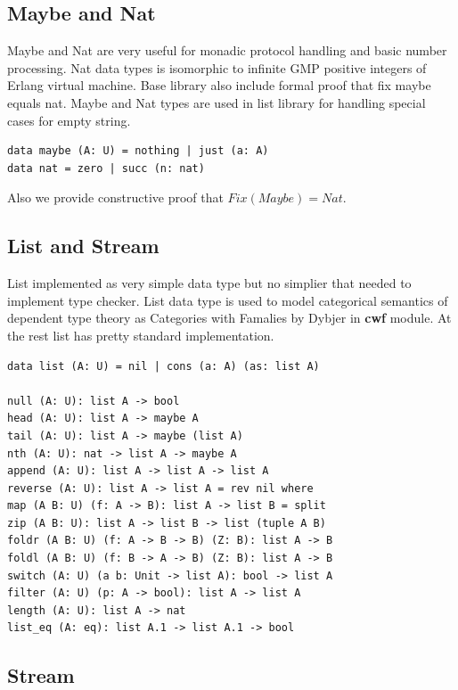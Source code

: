 \documentclass{article}
\begin{document}
\subsection{Maybe and Nat}

Maybe and Nat are very useful for monadic protocol handling
and basic number processing. Nat data types is isomorphic
to infinite GMP positive integers of Erlang virtual machine.
Base library also include formal proof that fix maybe equals nat.
Maybe and Nat types are used in list library for handling special cases
for empty string.

\begin{lstlisting}[mathescape=true]
data maybe (A: U) = nothing | just (a: A)
data nat = zero | succ (n: nat)
\end{lstlisting}

Also we provide constructive proof that $Fix(Maybe) = Nat$.

\subsection{List and Stream}

List implemented as very simple data type but no simplier
that needed to implement type checker. List data type is
used to model categorical semantics of dependent type theory
as Categories with Famalies by Dybjer in {\bf cwf} module.
At the rest list has pretty standard implementation.

\begin{lstlisting}[mathescape=true]
data list (A: U) = nil | cons (a: A) (as: list A)

null (A: U): list A -> bool
head (A: U): list A -> maybe A
tail (A: U): list A -> maybe (list A)
nth (A: U): nat -> list A -> maybe A
append (A: U): list A -> list A -> list A
reverse (A: U): list A -> list A = rev nil where
map (A B: U) (f: A -> B): list A -> list B = split
zip (A B: U): list A -> list B -> list (tuple A B)
foldr (A B: U) (f: A -> B -> B) (Z: B): list A -> B
foldl (A B: U) (f: B -> A -> B) (Z: B): list A -> B
switch (A: U) (a b: Unit -> list A): bool -> list A
filter (A: U) (p: A -> bool): list A -> list A
length (A: U): list A -> nat
list_eq (A: eq): list A.1 -> list A.1 -> bool
\end{lstlisting}

\subsection*{Stream}
\end{document}
